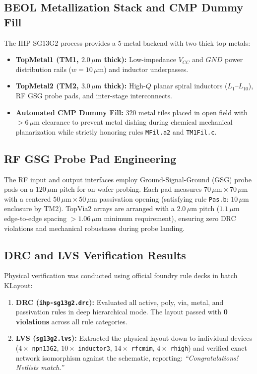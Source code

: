 \documentclass[conference]{IEEEtran}
\begin{document}
\subsection{BEOL Metallization Stack and CMP Dummy Fill}
The IHP SG13G2 process provides a 5-metal backend with two thick top metals:
\begin{itemize}
    \item \textbf{TopMetal1 (TM1, $2.0\,\mu\text{m}$ thick):} Low-impedance $V_{CC}$ and $GND$ power distribution rails ($w = 10\,\mu\text{m}$) and inductor underpasses.
    \item \textbf{TopMetal2 (TM2, $3.0\,\mu\text{m}$ thick):} High-$Q$ planar spiral inductors ($L_1$--$L_{10}$), RF GSG probe pads, and inter-stage interconnects.
    \item \textbf{Automated CMP Dummy Fill:} 320 metal tiles placed in open field with $> 6\,\mu\text{m}$ clearance to prevent metal dishing during chemical mechanical planarization while strictly honoring rules \texttt{MFil.a2} and \texttt{TM1Fil.c}.
\end{itemize}

\subsection{RF GSG Probe Pad Engineering}
The RF input and output interfaces employ Ground-Signal-Ground (GSG) probe pads on a $120\,\mu\text{m}$ pitch for on-wafer probing. Each pad measures $70\,\mu\text{m} \times 70\,\mu\text{m}$ with a centered $50\,\mu\text{m} \times 50\,\mu\text{m}$ passivation opening (satisfying rule \texttt{Pas.b}: $10\,\mu\text{m}$ enclosure by TM2). TopVia2 arrays are arranged with a $2.0\,\mu\text{m}$ pitch ($1.1\,\mu\text{m}$ edge-to-edge spacing $> 1.06\,\mu\text{m}$ minimum requirement), ensuring zero DRC violations and mechanical robustness during probe landing.

\subsection{DRC and LVS Verification Results}
Physical verification was conducted using official foundry rule decks in batch KLayout:
\begin{enumerate}
    \item \textbf{DRC (\texttt{ihp-sg13g2.drc}):} Evaluated all active, poly, via, metal, and passivation rules in deep hierarchical mode. The layout passed with \textbf{0 violations} across all rule categories.
    \item \textbf{LVS (\texttt{sg13g2.lvs}):} Extracted the physical layout down to individual devices ($4\times$ \texttt{npn13G2}, $10\times$ \texttt{inductor3}, $14\times$ \texttt{rfcmim}, $4\times$ \texttt{rhigh}) and verified exact network isomorphism against the schematic, reporting: \textit{``Congratulations! Netlists match.''}
\end{enumerate}
\end{document}
